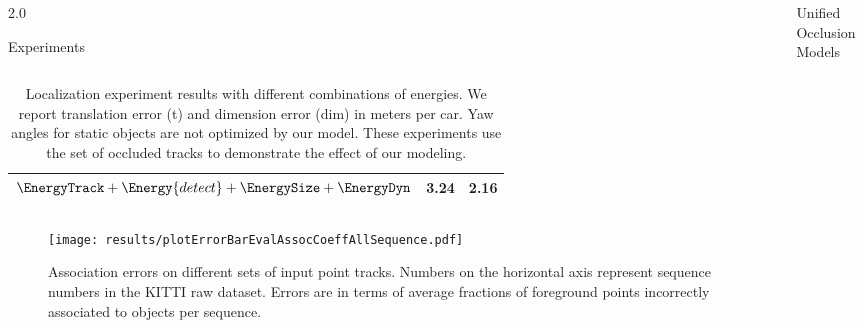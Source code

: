 \documentclass[handout,final]{beamer}
\newlength{\sepwid}
\newlength{\onecolwid}
\begin{document}
\begin{frame}[t]
\begin{columns}[t]
\begin{column}{2.0\onecolwid}
\begin{block}{Experiments}
\begin{columns}[t]
\begin{table}
\begin{tabular}{lrr}
              $\EnergyTrack + \Energy{detect} +\EnergySize+\EnergyDyn$             
              & {\bf 3.24}  & 2.16\\
              \bottomrule
            \end{tabular}
            \caption{\small Localization experiment results with different combinations of energies. We report translation error (t) and dimension error (dim) in meters per car. Yaw angles for static objects are not optimized by our model. These experiments use the set of occluded tracks to demonstrate the effect of our modeling.}
          \end{table}
        \end{columns}
      
        \begin{figure}[!!t]
          \centering
          \texttt{[image: results/plotErrorBarEvalAssocCoeffAllSequence.pdf]}
		  \caption{\small Association errors on different sets of input point tracks. Numbers on the horizontal axis represent sequence numbers in the KITTI raw dataset. Errors are in terms of average fractions of foreground points incorrectly associated to objects per sequence.}
        \end{figure}
        \newlength{\tblimgwidth}
        \setlength{\tblimgwidth}{0.080\textwidth}
                                        
      \end{block}
    \end{column}
    \begin{column}{\sepwid}\end{column}			%
    \begin{column}{\onecolwid}
      \begin{block}{Unified Occlusion Models}  
      

\end{block}
\end{column}
\end{columns}
\end{frame}
\end{document}

